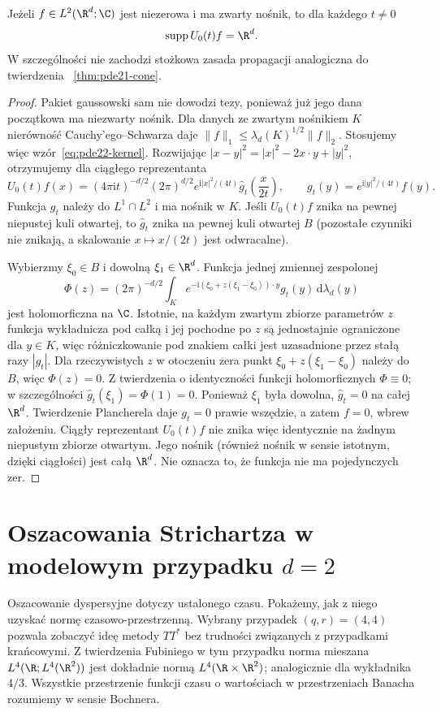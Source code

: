 \begin{stwierdzenie}
Jeżeli $f\in L^2(\R^d;\C)$ jest niezerowa i ma
zwarty nośnik, to dla każdego $t\ne0$
\[
 \operatorname{supp}U_0(t)f=\R^d.
\]
W szczególności nie zachodzi stożkowa zasada
propagacji analogiczna do twierdzenia
~\ref{thm:pde21-cone}.
\end{stwierdzenie}
\begin{proof}
Pakiet gaussowski sam nie dowodzi tezy, ponieważ
już jego dana początkowa ma niezwarty nośnik.
Dla danych ze zwartym nośnikiem $K$ nierówność
Cauchy'ego--Schwarza daje
$\|f\|_1\le\lambda_d(K)^{1/2}\|f\|_2$.
Stosujemy więc wzór~\eqref{eq:pde22-kernel}.
Rozwijając $|x-y|^2=|x|^2-2x\cdot y+|y|^2$,
otrzymujemy dla ciągłego reprezentanta
\[
 U_0(t)f(x)=(4\pi\mathrm it)^{-d/2}(2\pi)^{d/2}
  e^{\mathrm i|x|^2/(4t)}
  \widehat g_t\!\left(\frac{x}{2t}\right),\qquad
 g_t(y)=e^{\mathrm i|y|^2/(4t)}f(y).
\]
Funkcja $g_t$ należy do $L^1\cap L^2$ i ma
nośnik w $K$. Jeśli $U_0(t)f$ znika na pewnej
niepustej kuli otwartej, to $\widehat g_t$ znika
na pewnej kuli otwartej $B$ (pozostałe czynniki
nie znikają, a skalowanie $x\mapsto x/(2t)$
jest odwracalne).

Wybierzmy $\xi_0\in B$ i dowolną $\xi_1\in\R^d$.
Funkcja jednej zmiennej zespolonej
\[
 \Phi(z)=(2\pi)^{-d/2}\int_K
   e^{-\mathrm i(\xi_0+z(\xi_1-\xi_0))\cdot y}
   g_t(y)\,\mathrm d\lambda_d(y)
\]
jest holomorficzna na $\C$. Istotnie, na każdym
zwartym zbiorze parametrów $z$ funkcja wykładnicza
pod całką i jej pochodne po $z$ są jednostajnie ograniczone
dla $y\in K$, więc różniczkowanie pod znakiem
całki jest uzasadnione przez stałą razy $|g_t|$.
Dla rzeczywistych $z$ w otoczeniu zera punkt
$\xi_0+z(\xi_1-\xi_0)$ należy do $B$, więc
$\Phi(z)=0$. Z twierdzenia o identyczności
funkcji holomorficznych $\Phi\equiv0$; w szczególności
$\widehat g_t(\xi_1)=\Phi(1)=0$.
Ponieważ $\xi_1$ była dowolna, $\widehat g_t=0$
na całej $\R^d$. Twierdzenie Plancherela daje
$g_t=0$ prawie wszędzie, a zatem $f=0$,
wbrew założeniu.
Ciągły reprezentant $U_0(t)f$ nie znika więc
identycznie na żadnym niepustym zbiorze otwartym.
Jego nośnik (również nośnik w sensie istotnym,
dzięki ciągłości) jest całą $\R^d$.
Nie oznacza to, że funkcja nie ma pojedynczych zer.
\end{proof}

\section[Oszacowania Strichartza w dwóch wymiarach]{Oszacowania Strichartza w modelowym przypadku $d=2$}
Oszacowanie dyspersyjne dotyczy ustalonego czasu. Pokażemy,
jak z niego uzyskać normę czasowo-przestrzenną.
Wybrany przypadek $(q,r)=(4,4)$ pozwala zobaczyć ideę
metody $TT^*$ bez trudności związanych z przypadkami
krańcowymi. Z twierdzenia Fubiniego w tym przypadku
norma mieszana $L^4(\R;L^4(\R^2))$ jest dokładnie
normą $L^4(\R\times\R^2)$; analogicznie dla wykładnika
$4/3$. Wszystkie przestrzenie funkcji czasu o
wartościach w przestrzeniach Banacha rozumiemy
w sensie Bochnera.

